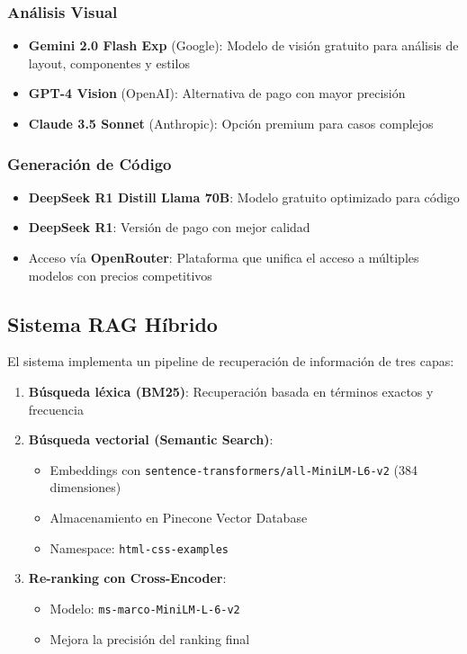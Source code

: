 \documentclass[12pt,a4paper]{article}
\begin{document}
\subsubsection{Análisis Visual}
\begin{itemize}
    \item \textbf{Gemini 2.0 Flash Exp} (Google): Modelo de visión gratuito para análisis de layout, componentes y estilos
    \item \textbf{GPT-4 Vision} (OpenAI): Alternativa de pago con mayor precisión
    \item \textbf{Claude 3.5 Sonnet} (Anthropic): Opción premium para casos complejos
\end{itemize}

\subsubsection{Generación de Código}
\begin{itemize}
    \item \textbf{DeepSeek R1 Distill Llama 70B}: Modelo gratuito optimizado para código
    \item \textbf{DeepSeek R1}: Versión de pago con mejor calidad
    \item Acceso vía \textbf{OpenRouter}: Plataforma que unifica el acceso a múltiples modelos con precios competitivos
\end{itemize}

\subsection{Sistema RAG Híbrido}

El sistema implementa un pipeline de recuperación de información de tres capas:

\begin{enumerate}
    \item \textbf{Búsqueda léxica (BM25)}: Recuperación basada en términos exactos y frecuencia
    \item \textbf{Búsqueda vectorial (Semantic Search)}: 
    \begin{itemize}
        \item Embeddings con \texttt{sentence-transformers/all-MiniLM-L6-v2} (384 dimensiones)
        \item Almacenamiento en Pinecone Vector Database
        \item Namespace: \texttt{html-css-examples}
    \end{itemize}
    \item \textbf{Re-ranking con Cross-Encoder}:
    \begin{itemize}
        \item Modelo: \texttt{ms-marco-MiniLM-L-6-v2}
        \item Mejora la precisión del ranking final
    \end{itemize}
\end{enumerate}
\end{document}
